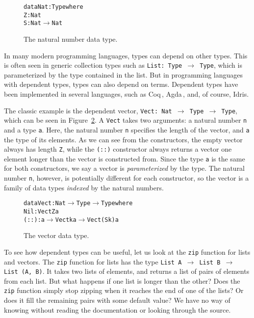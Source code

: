 \begin{figure}
\begin{alltt}
data Nat : Type where
  Z : Nat
  S : Nat \(\to\) Nat
\end{alltt}
\caption{The natural number data type.}
\label{fig:nat}
\end{figure}

In many modern programming languages, types can depend on other types. This is often seen in generic collection types such as \texttt{List:~Type~\(\to\) Type}, which is parameterized by the type contained in the list. But in programming languages with dependent types, types can also depend on terms. Dependent types have been implemented in several languages, such as Coq\,\cite{Coq}, Agda\,\cite{Agda}, and, of course, Idris. 

The classic example is the dependent vector, \texttt{Vect:~Nat~\(\to\) Type~\(\to\) Type}, which can be seen in Figure~\ref{fig:vect}. A \texttt{Vect} takes two arguments: a natural number \texttt{n} and a type \texttt{a}. Here, the natural number \texttt{n} specifies the length of the vector, and \texttt{a} the type of its elements. As we can see from the constructors, the empty vector always has length \texttt{Z}, while the \texttt{(::)} constructor always returns a vector one element longer than the vector is constructed from. Since the type \texttt{a} is the same for both constructors, we say a vector is \emph{parameterized} by the type. The natural number \texttt{n}, however, is potentially different for each constructor, so the vector is a family of data types \emph{indexed} by the natural numbers.

\begin{figure}
\begin{alltt}
data Vect : Nat \(\to\) Type \(\to\) Type where
  Nil  : Vect Z a
  (::) : a \(\to\) Vect k a \(\to\) Vect (S k) a
\end{alltt}
\caption{The vector data type.}
\label{fig:vect}
\end{figure}

To see how dependent types can be useful, let us look at the \texttt{zip} function for lists and vectors. The \texttt{zip} function for lists has the type \texttt{List~A~$\to$ List~B~$\to$ List~(A,~B)}. It takes two lists of elements, and returns a list of pairs of elements from each list. But what happens if one list is longer than the other? Does the \texttt{zip} function simply stop zipping when it reaches the end of one of the lists? Or does it fill the remaining pairs with some default value? We have no way of knowing without reading the documentation or looking through the source.

